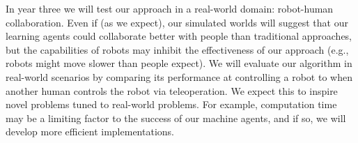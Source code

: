 
In year three we will test our approach in a real-world domain:
robot-human collaboration.  Even if (as we expect), our simulated worlds
will suggest that our
learning agents could collaborate better with people than traditional
approaches, but the capabilities of robots may inhibit the
effectiveness of our approach (e.g., robots might move slower than
people expect). We will evaluate our algorithm in real-world scenarios
by comparing its performance at controlling a robot to when another
human controls the robot via teleoperation. We expect this to inspire
novel problems tuned to real-world problems. For example, computation
time may be a limiting factor to the success of our machine agents,
and if so, we will develop more efficient implementations.

